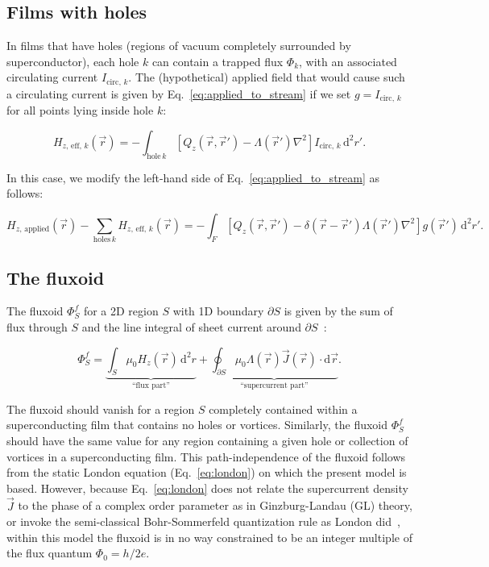 \documentclass[final,3p,times]{elsarticle}
\newcounter{bla}
\begin{document}
\subsection{Films with holes}
\label{section:model:holes}

In films that have holes (regions of vacuum completely surrounded by superconductor), each hole $k$ can contain a trapped flux $\Phi_k$, with an associated circulating current $I_{\mathrm{circ},\,k}$. The (hypothetical) applied field that would cause such a circulating current is given by Eq.~\ref{eq:applied_to_stream} if we set $g=I_{\mathrm{circ},\,k}$ for all points lying inside hole $k$:

\begin{equation}
    \label{eq:Heff}
    H_{z,\,\mathrm{eff},\,k}(\vec{r}) = -\int_{\mathrm{hole}\,k}[
        Q_z(\vec{r},\vec{r}')-\Lambda(\vec{r}')\nabla^2
    ] I_{\mathrm{circ},\,k} \,\mathrm{d}^2r'.   
\end{equation}

In this case, we modify the left-hand side of Eq.~\ref{eq:applied_to_stream} as follows:

\begin{equation}
    \label{eq:Heff_sub}
    H_{z,\,\mathrm{applied}}(\vec{r}) - \sum_{\mathrm{holes}\,k} H_{z,\,\mathrm{eff},\,k}(\vec{r})
    = -\int_F\left[
        Q_z(\vec{r},\vec{r}')-\delta(\vec{r}-\vec{r}')\Lambda(\vec{r}')\nabla^2\right
    ]g(\vec{r}')\,\mathrm{d}^2r'.
\end{equation}

\subsection{The fluxoid}
\label{section:model:fluxoid}

The fluxoid $\Phi^f_S$ for a 2D region $S$ with 1D boundary $\partial S$ is given by the sum of flux through $S$ and the line integral of sheet current around $\partial S$~\cite{brandt_thin_2005,Clem_Brandt_2005,tinkham2004introduction}:

\begin{equation}
    \Phi^f_S = \underbrace{\int_S\mu_0H_z(\vec{r})\,\mathrm{d}^2r}_\text{``flux part''} + \underbrace{\oint_{\partial S}\mu_0\Lambda(\vec{r})\vec{J}(\vec{r})\cdot\mathrm{d}\vec{r}}_\text{``supercurrent part''}.
    \label{eq:fluxoid}
\end{equation}

The fluxoid should vanish for a region $S$ completely contained within a superconducting film that contains no holes or vortices. Similarly, the fluxoid $\Phi^f_S$ should have the same value for any region containing a given hole or collection of vortices in a superconducting film. This path-independence of the fluxoid follows from the static London equation (Eq.~\ref{eq:london}) on which the present model is based. However, because Eq.~\ref{eq:london} does not relate the supercurrent density $\vec{J}$ to the phase of a complex order parameter as in Ginzburg-Landau (GL) theory, or invoke the semi-classical Bohr-Sommerfeld quantization rule as London did~\cite{tinkham2004introduction}, within this model the fluxoid is in no way constrained to be an integer multiple of the flux quantum $\Phi_0=h/2e$.
\end{document}
